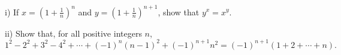 i) If $x = \left(1+\frac{1}{n}\right)^{n}$ and $y=\left(1+\frac{1}{n}\right)^{n+1}$,  show that $y^{x}= x^{y}$.

ii) Show that, for all positive integers $n$,  \[1^{2}-2^{2}+3^{2}-4^{2}+\cdots+(-1)^{n}(n-1)^{2}+(-1)^{n+1}n^{2}= (-1)^{n+1}(1+2+\cdots+n).\]